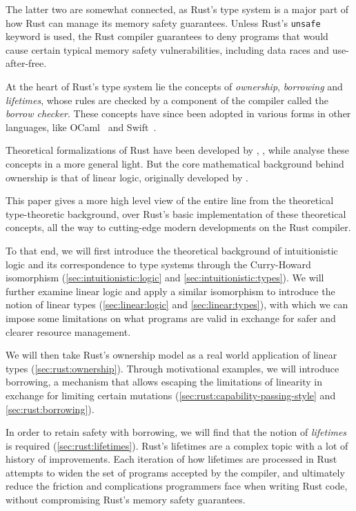 \documentclass[sigplan,11pt,screen,nonacm]{acmart}
\begin{document}
The latter two are somewhat connected, as Rust's type system is a major part of how Rust can manage its memory safety guarantees. Unless Rust's \texttt{unsafe} keyword is used, the Rust compiler guarantees to deny programs that would cause certain typical memory safety vulnerabilities, including data races and use-after-free.

At the heart of Rust's type system lie the concepts of \emph{ownership}, \emph{borrowing} and \emph{lifetimes}, whose rules are checked by a component of the compiler called the \emph{borrow checker}. These concepts have since been adopted in various forms in other languages, like OCaml~\cite{intro:ocaml-ownership} and Swift~\cite{intro:swift-ownership}.

Theoretical formalizations of Rust have been developed by \citet{rust:oxide}, \citet{rust:rustbelt}, while \citet{from-linearity-to-borrowing} analyse these concepts in a more general light. But the core mathematical background behind ownership is that of linear logic, originally developed by \citet{girard-linear-logic}.

This paper gives a more high level view of the entire line from the theoretical type-theoretic background, over Rust's basic implementation of these theoretical concepts, all the way to cutting-edge modern developments on the Rust compiler.

To that end, we will first introduce the theoretical background of intuitionistic logic and its correspondence to type systems through the Curry-Howard isomorphism (\cref{sec:intuitionistic:logic} and \cref{sec:intuitionistic:types}). We will further examine linear logic and apply a similar isomorphism to introduce the notion of linear types (\cref{sec:linear:logic} and \cref{sec:linear:types}), with which we can impose some limitations on what programs are valid in exchange for safer and clearer resource management.

We will then take Rust's ownership model as a real world application of linear types (\cref{sec:rust:ownership}). Through motivational examples, we will introduce borrowing, a mechanism that allows escaping the limitations of linearity in exchange for limiting certain mutations (\cref{sec:rust:capability-passing-style} and \cref{sec:rust:borrowing}).

In order to retain safety with borrowing, we will find that the notion of \emph{lifetimes} is required (\cref{sec:rust:lifetimes}). Rust's lifetimes are a complex topic with a lot of history of improvements. Each iteration of how lifetimes are processed in Rust attempts to widen the set of programs accepted by the compiler, and ultimately reduce the friction and complications programmers face when writing Rust code, without compromising Rust's memory safety guarantees.
\end{document}
